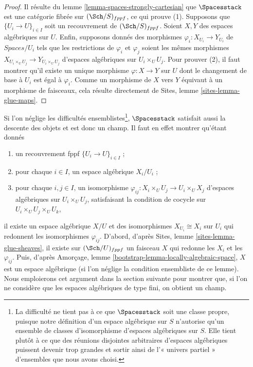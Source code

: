 \begin{proof}
Il résulte du
lemme \ref{lemma-spaces-strongly-cartesian}
que $\Spacesstack$ est une catégorie fibrée sur $(\Sch/S)_{fppf}$,
ce qui prouve (1).
Supposons que $\{U_i \to U\}_{i \in I}$ soit un recouvrement de
$(\Sch/S)_{fppf}$. Soient $X, Y$ des espaces algébriques sur
$U$. Enfin, supposons donnés des morphismes $\varphi_i : X_{U_i} \to Y_{U_i}$
de $\textit{Spaces}/U_i$ tels que les restrictions de $\varphi_i$ et $\varphi_j$
soient les mêmes morphismes $X_{U_i \times_U U_j} \to Y_{U_i \times_U U_j}$
d'espaces algébriques sur $U_i \times_U U_j$.
Pour prouver (2), il faut montrer qu'il existe un unique morphisme
$\varphi  : X \to Y$ sur $U$ dont le changement de base à $U_i$ est
égal à $\varphi_i$. Comme un morphisme de $X$ vers $Y$ équivaut à
un morphisme de faisceaux, cela résulte directement de
Sites, lemme \ref{sites-lemma-glue-maps}.
\end{proof}

\begin{remark}
\label{remark-stack-spaces}
Si l'on néglige les difficultés ensemblistes\footnote{La difficulté ne tient pas
à ce que $\Spacesstack$ soit une classe propre, puisque notre définition d'un
espace algébrique sur $S$ n'autorise qu'un ensemble de
classes d'isomorphisme d'espaces algébriques sur $S$. Elle tient plutôt à ce que
des réunions disjointes arbitraires d'espaces algébriques puissent devenir trop grandes
et sortir ainsi de l'« univers partiel » d'ensembles que nous avons choisi.},
$\Spacesstack$ satisfait aussi
la descente des objets et est donc un champ. Il faut en effet montrer qu'étant donnés
\begin{enumerate}
\item un recouvrement fppf $\{U_i \to U\}_{i \in I}$ ;
\item pour chaque $i \in I$, un espace algébrique $X_i/U_i$ ;
\item pour chaque $i, j \in I$, un isomorphisme
$\varphi_{ij} : X_i \times_U U_j \to U_i \times_U X_j$ d'espaces algébriques
sur $U_i \times_U U_j$, satisfaisant la condition de cocycle sur
$U_i \times_U U_j \times_U U_k$,
\end{enumerate}
il existe un espace algébrique $X/U$ et des isomorphismes
$X_{U_i} \cong X_i$ sur $U_i$ qui redonnent les isomorphismes $\varphi_{ij}$.
D'abord, d'après
Sites, lemme \ref{sites-lemma-glue-sheaves},
il existe sur $(\Sch/U)_{fppf}$ un faisceau $X$ qui redonne
les $X_i$ et les $\varphi_{ij}$. Puis, d'après
Amorçage, lemme \ref{bootstrap-lemma-locally-algebraic-space},
$X$ est un espace algébrique (si l'on néglige la condition ensembliste
de ce lemme).
Nous emploierons cet argument dans la section suivante pour montrer que,
si l'on ne considère que les espaces algébriques de type fini, on obtient
un champ.
\end{remark}





